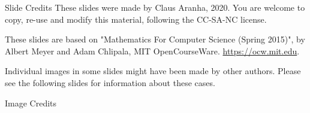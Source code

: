 \begin{frame}{Slide Credits}
  These slides were made by Claus Aranha, 2020. You are welcome to copy, re-use and modify this material, following the CC-SA-NC license.
  \bigskip

  These slides are based on "Mathematics For Computer Science (Spring 2015)", by Albert Meyer and Adam Chlipala, MIT OpenCourseWare. \url{https://ocw.mit.edu}.
  \bigskip

  Individual images in some slides might have been made by other
  authors. Please see the following slides for information about these cases.
\end{frame}

\begin{frame}[allowframebreaks]{Image Credits}
  \printnotes
\end{frame}
